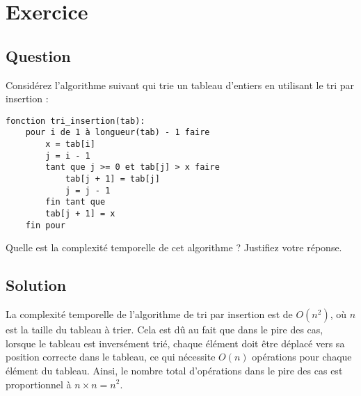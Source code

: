 \documentclass{article}
\begin{document}
\section{Exercice}

\subsection*{Question}
Considérez l'algorithme suivant qui trie un tableau d'entiers en utilisant le tri par insertion :
\begin{verbatim}
fonction tri_insertion(tab):
    pour i de 1 à longueur(tab) - 1 faire
        x = tab[i]
        j = i - 1
        tant que j >= 0 et tab[j] > x faire
            tab[j + 1] = tab[j]
            j = j - 1
        fin tant que
        tab[j + 1] = x
    fin pour
\end{verbatim}

Quelle est la complexité temporelle de cet algorithme ? Justifiez votre réponse.

\subsection*{Solution}
La complexité temporelle de l'algorithme de tri par insertion est de \(O(n^2)\), où \(n\) est la taille du tableau à trier. Cela est dû au fait que dans le pire des cas, lorsque le tableau est inversément trié, chaque élément doit être déplacé vers sa position correcte dans le tableau, ce qui nécessite \(O(n)\) opérations pour chaque élément du tableau. Ainsi, le nombre total d'opérations dans le pire des cas est proportionnel à \(n \times n = n^2\).
\end{document}
